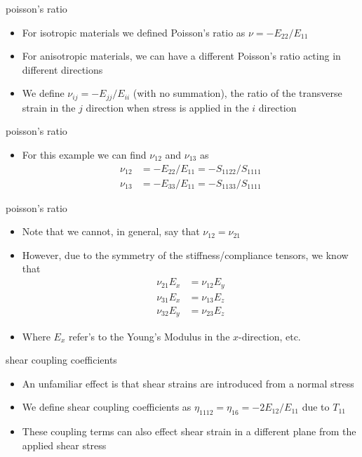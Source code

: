 \documentclass[
  letterpaper,
  ignorenonframetext,
  aspectratio=43,
  handout,
  12pt]{beamer}
\providecommand{\tightlist}{%
  \setlength{\itemsep}{0pt}\setlength{\parskip}{0pt}}
\providecommand{\tightlist}{%
\setlength{\itemsep}{0pt}\setlength{\parskip}{0pt}}
\begin{document}
\begin{frame}{poisson's ratio}
\protect\hypertarget{poissons-ratio}{}
\begin{itemize}
\tightlist
\item
  For isotropic materials we defined Poisson's ratio as
  \(\nu = -E_{22}/E_{11}\)
\item
  For anisotropic materials, we can have a different Poisson's ratio
  acting in different directions
\item
  We define \(\nu_{ij} = -E_{jj}/E_{ii}\) (with no summation), the ratio
  of the transverse strain in the \(j\) direction when stress is applied
  in the \(i\) direction
\end{itemize}
\end{frame}

\begin{frame}{poisson's ratio}
\protect\hypertarget{poissons-ratio-1}{}
\begin{itemize}
\tightlist
\item
  For this example we can find \(\nu_{12}\) and \(\nu_{13}\) as
  \[\begin{aligned}
    \nu_{12} &= -E_{22}/E_{11} = -S_{1122}/S_{1111}\\
    \nu_{13} &= -E_{33}/E_{11} = -S_{1133}/S_{1111}
  \end{aligned}\]
\end{itemize}
\end{frame}

\begin{frame}{poisson's ratio}
\protect\hypertarget{poissons-ratio-2}{}
\begin{itemize}
\item
  Note that we cannot, in general, say that \(\nu_{12} = \nu_{21}\)
\item
  However, due to the symmetry of the stiffness/compliance tensors, we
  know that \[\begin{aligned}
    \nu_{21} E_{x} &= \nu_{12} E_{y}\\
    \nu_{31} E_{x} &= \nu_{13} E_{z}\\
    \nu_{32} E_{y} &= \nu_{23} E_{z}
  \end{aligned}\]
\item
  Where \(E_{x}\) refer's to the Young's Modulus in the \(x\)-direction,
  etc.
\end{itemize}
\end{frame}

\begin{frame}{shear coupling coefficients}
\protect\hypertarget{shear-coupling-coefficients}{}
\begin{itemize}
\tightlist
\item
  An unfamiliar effect is that shear strains are introduced from a
  normal stress
\item
  We define shear coupling coefficients as
  \(\eta_{1112} = \eta_{16} = -2E_{12}/E_{11}\) due to \(T_{11}\)
\item
  These coupling terms can also effect shear strain in a different plane
  from the applied shear stress
\end{itemize}
\end{frame}
\end{document}
